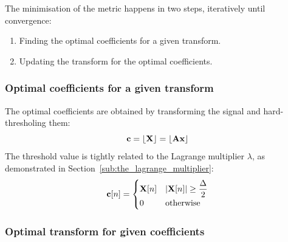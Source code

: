 \documentclass[11pt,a4paper,openright,twoside]{book}
\numberwithin{equation}{section} %
\begin{document}
The minimisation of the metric happens in two steps, iteratively until
convergence:
\begin{enumerate}
	\item Finding the optimal coefficients for a given transform.
	\item Updating the transform for the optimal coefficients.
\end{enumerate}

\subsubsection{Optimal coefficients for a given transform}
\label{ssub:optimal_coefficients_for_a_given_transform}

The optimal coefficients are obtained by transforming the signal and
hard-thresholing them:
\begin{equation}
	\mathbf{c} = \lfloor \mathbf{X} \rfloor = \lfloor \mathbf{A} \mathbf{x} \rfloor
\end{equation}
The threshold value is tightly related to the Lagrange multiplier $\lambda$,
as demonstrated in Section~\ref{sub:the_lagrange_multiplier}:
\begin{equation}
	\mathbf{c}[n] =
	\begin{cases}
		\mathbf{X}[n] & \vert \mathbf{X}[n] \vert \ge \displaystyle \frac{\Delta}{2} \\
		0     & \text{otherwise} \\
	\end{cases}
	\label{eqn:hard_threshold}
\end{equation}

\subsubsection{Optimal transform for given coefficients}
\label{ssub:optimal_transform_for_given_coefficients}
\end{document}

